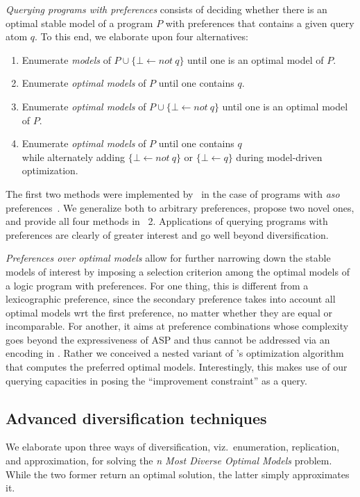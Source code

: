 \emph{Querying programs with preferences}
%
consists of 
deciding whether there is an optimal stable model of a program $P$ with preferences that contains a given query atom $q$.
%
To this end,
we elaborate upon four alternatives:%
\begin{enumerate}[label={\textcolor{darkgray}{\sffamily\bfseries\mathversion{bold}{Q-\arabic*}}}.]
\item Enumerate \emph{models} of $P \cup \{ \bot \leftarrow not \ q \}$ until one is an optimal model of $P$.
\item Enumerate \emph{optimal models} of $P$ until one contains $q$.
\item Enumerate \emph{optimal models} of $P \cup \{ \bot \leftarrow not \ q \}$ until one is an optimal model of $P$.
\item Enumerate \emph{optimal models} of $P$ until one contains $q$\\
  while alternately adding $\{ \bot \leftarrow not \ q \}$ or $\{ \bot \leftarrow q \}$ during model-driven optimization.
\end{enumerate}
%
The first two methods were implemented by~\cite{zhutru13a} in the case of programs with \emph{aso} preferences~\cite{brnitr03a}.
We generalize both to arbitrary preferences, propose two novel ones, and provide all four methods in \asprin~2.
%
Applications of querying programs with preferences are clearly of greater interest and go well beyond diversification.

\emph{Preferences over optimal models}
%
allow for further narrowing down the stable models of interest by imposing a selection criterion among the optimal models of a logic program with preferences.
%
For one thing, this is different from a lexicographic preference, since the secondary preference takes into account all optimal models wrt the first
preference, no matter whether they are equal or incomparable.
For another, it aims at preference combinations whose complexity goes beyond the expressiveness of ASP and thus cannot be addressed via an encoding
in \asprin.
Rather we conceived a nested variant of \asprin's optimization algorithm that computes the preferred optimal models.
Interestingly, this makes use of our querying capacities in posing the ``improvement constraint'' as a query.

\subsection{Advanced diversification techniques}
We elaborate upon three ways of diversification, viz.\ enumeration, replication, and approximation,
for solving the \emph{n Most Diverse Optimal Models} problem. 
While the two former return an optimal solution, the latter simply approximates it.

